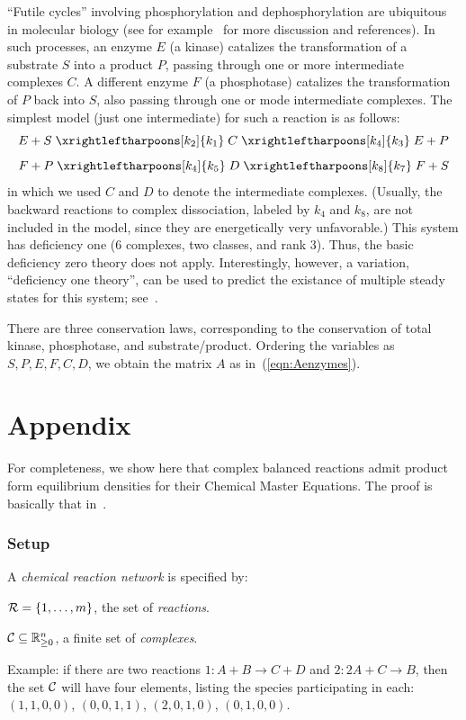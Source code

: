 \documentclass[11pt]{article}
\newcommand{\arrowschem}[2]{\xrightleftharpoons[#1]{#2}}
\newcommand{\R}{{\mathbb R}}  %
\begin{document}
``Futile cycles'' involving phosphorylation and dephosphorylation are
ubiquitous in molecular biology (see for example~\cite{wang:JNS07} for
more discussion and references).
In such processes, an enzyme $E$ (a kinase)
catalizes the transformation of a substrate $S$ into a product $P$, passing
through one or more intermediate complexes $C$.  A different enzyme $F$ (a
phosphotase) catalizes the transformation of $P$ back into $S$, also passing
through one or mode intermediate complexes.
The simplest model (just one intermediate) for such a reaction is as follows:
\[
E+S\;\arrowschem{k_2}{k_1}\;C\;\arrowschem{k_4}{k_3}\;E+P
\]
\[
F+P\;\arrowschem{k_4}{k_5}\;D\;\arrowschem{k_8}{k_7}\;F+S
\]
in which we used $C$ and $D$ to denote the intermediate complexes.
(Usually, the backward reactions to complex dissociation, labeled by
$k_4$ and $k_8$, are not included in the model, since they are energetically
very unfavorable.)
This system has deficiency one (6 complexes, two classes, and rank 3).  Thus,
the basic deficiency zero theory does not apply.  Interestingly, however, a
variation, ``deficiency one theory'', can be used to predict the existance of
multiple steady states for this system; see~\cite{conradi}.

There are three conservation laws, corresponding to the conservation of
total kinase, phosphotase, and substrate/product.
Ordering the variables as $S,P,E,F,C,D$, we obtain the matrix $A$ as
in~(\ref{eqn:Aenzymes}).

\appendix

\section*{Appendix}

For completeness, we show here that complex balanced reactions admit
product form equilibrium densities for their Chemical Master Equations.
The proof is basically that in~\cite{anderson08,kelly,mairesse09}.

\subsubsection*{Setup}

A \emph{chemical reaction network} is specified by:

${\cal R} = \{1,\ldots ,m\}$, the set of \emph{reactions}.

${\cal C}\subseteq \R^n_{\geq 0}$, a finite set of \emph{complexes}.

Example: if there are two reactions $1: A+B \rightarrow  C+D$ and $2: 2A+C \rightarrow  B$, then
the set ${\cal C}$ will have four elements, listing the species participating in
each: 
$(1,1,0,0)$,
$(0,0,1,1)$,
$(2,0,1,0)$,
$(0,1,0,0)$.
\end{document}
